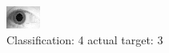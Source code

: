 \begin{figure}[h!]
\begin{center}
\includegraphics[width=0.60\columnwidth]{figures/ID1838_class_4_target_3.png}
\end{center}
\caption{ Classification: 4 actual target: 3}
\label{fig:ID1838_class_4_target_3}
\end{figure}
